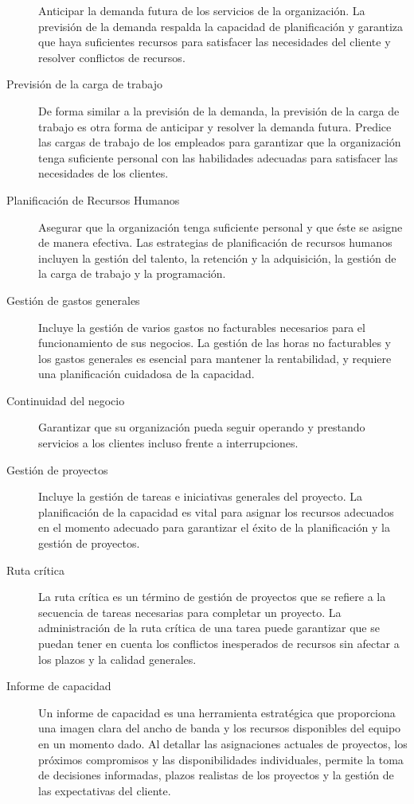 \documentclass[
  paper=a4,
  ,captions=tableheading
]{scrartcl}
\begin{document}
\begin{description}
Anticipar la demanda futura de los servicios de la organización. La
previsión de la demanda respalda la capacidad de planificación y
garantiza que haya suficientes recursos para satisfacer las necesidades
del cliente y resolver conflictos de recursos.
\item[Previsión de la carga de trabajo]
De forma similar a la previsión de la demanda, la previsión de la carga
de trabajo es otra forma de anticipar y resolver la demanda futura.
Predice las cargas de trabajo de los empleados para garantizar que la
organización tenga suficiente personal con las habilidades adecuadas
para satisfacer las necesidades de los clientes.
\item[Planificación de Recursos Humanos]
Asegurar que la organización tenga suficiente personal y que éste se
asigne de manera efectiva. Las estrategias de planificación de recursos
humanos incluyen la gestión del talento, la retención y la adquisición,
la gestión de la carga de trabajo y la programación.
\item[Gestión de gastos generales]
Incluye la gestión de varios gastos no facturables necesarios para el
funcionamiento de sus negocios. La gestión de las horas no facturables y
los gastos generales es esencial para mantener la rentabilidad, y
requiere una planificación cuidadosa de la capacidad.
\item[Continuidad del negocio]
Garantizar que su organización pueda seguir operando y prestando
servicios a los clientes incluso frente a interrupciones.
\item[Gestión de proyectos]
Incluye la gestión de tareas e iniciativas generales del proyecto. La
planificación de la capacidad es vital para asignar los recursos
adecuados en el momento adecuado para garantizar el éxito de la
planificación y la gestión de proyectos.
\item[Ruta crítica]
La ruta crítica es un término de gestión de proyectos que se refiere a
la secuencia de tareas necesarias para completar un proyecto. La
administración de la ruta crítica de una tarea puede garantizar que se
puedan tener en cuenta los conflictos inesperados de recursos sin
afectar a los plazos y la calidad generales.
\item[Informe de capacidad]
Un informe de capacidad es una herramienta estratégica que proporciona
una imagen clara del ancho de banda y los recursos disponibles del
equipo en un momento dado. Al detallar las asignaciones actuales de
proyectos, los próximos compromisos y las disponibilidades individuales,
permite la toma de decisiones informadas, plazos realistas de los
proyectos y la gestión de las expectativas del cliente.
\end{description}
\end{document}
